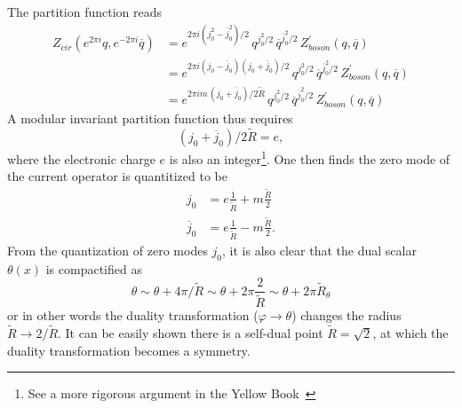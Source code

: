 The partition function reads
\begin{equation}
	\begin{aligned}
		Z_{cir}(e^{2\pi i}q,e^{-2\pi i}\overline{q}) &= e^{2\pi i \left(j_0^2 - \overline{j}_0^2\right)/2} \, q^{j_0^2/2} \, \overline{q}^{\overline{j}_0^2/2} \, Z^{\prime}_{boson} (q,\overline{q}) \\
		&=e^{2\pi i \left(j_0 - \overline{j}_0\right) \left(j_0 + \overline{j}_0\right)/2} \, q^{j_0^2/2} \, \overline{q}^{\overline{j}_0^2/2} \, Z^{\prime}_{boson} (q,\overline{q}) \\
		&=e^{2\pi i m\, \left(j_0 + \overline{j}_0\right)/2\tilde{R}} \, q^{j_0^2/2} \, \overline{q}^{\overline{j}_0^2/2} \, Z^{\prime}_{boson} (q,\overline{q})
	\end{aligned}
\end{equation}
A modular invariant partition function thus requires 
\begin{equation}
	\left(j_0 + \overline{j}_0\right)/2\tilde{R} = e,
\end{equation}
where the electronic charge $e$ is also an integer\footnote{See a more rigorous argument in the Yellow Book~\cite{francesco2012conformal}}. One then finds the zero mode of the current operator is quantitized to be 
\begin{equation}
	\begin{aligned}
		j_0 &= e \frac{1}{\tilde{R}} + m \frac{\tilde{R}}{2} \\
		\overline{j}_0 &= e \frac{1}{\tilde{R}} - m \frac{\tilde{R}}{2}.
	\end{aligned}
\end{equation}
From the quantization of zero modes $j_0$, it is also clear that the dual scalar $\theta(x)$ is compactified as 
\begin{equation}
	\theta \sim \theta + 4\pi/\tilde{R} \sim \theta + 2\pi \frac{2}{\tilde{R}} \sim \theta + 2\pi \tilde{R}_\theta 
\end{equation}
or in other words the duality transformation ($\varphi \rightarrow  \theta$) changes the radius $\tilde{R} \rightarrow 2/\tilde{R}$. It can be easily shown there is a self-dual point $\tilde{R} = \sqrt{2}$, at which the duality transformation becomes a symmetry.

